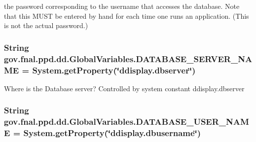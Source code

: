 the password corresponding to the username that accesses the database. Note that this M\-U\-S\-T be entered by hand for each time one runs an application. (This is not the actual password.) \hypertarget{classgov_1_1fnal_1_1ppd_1_1dd_1_1GlobalVariables_a84bb07dcee9c961579282f50a5031c0e}{
\subsubsection[{D\-A\-T\-A\-B\-A\-S\-E\-\_\-\-S\-E\-R\-V\-E\-R\-\_\-\-N\-A\-M\-E}]{\setlength{\rightskip}{0pt plus 5cm}String gov.\-fnal.\-ppd.\-dd.\-Global\-Variables.\-D\-A\-T\-A\-B\-A\-S\-E\-\_\-\-S\-E\-R\-V\-E\-R\-\_\-\-N\-A\-M\-E = System.\-get\-Property(\char`\"{}ddisplay.\-dbserver\char`\"{})\hspace{0.3cm}{\ttfamily [static]}}}\label{classgov_1_1fnal_1_1ppd_1_1dd_1_1GlobalVariables_a84bb07dcee9c961579282f50a5031c0e}
Where is the Database server? Controlled by system constant ddisplay.\-dbserver \hypertarget{classgov_1_1fnal_1_1ppd_1_1dd_1_1GlobalVariables_a1b5c1519d1964bf42b3fe4908ae6d444}{
\subsubsection[{D\-A\-T\-A\-B\-A\-S\-E\-\_\-\-U\-S\-E\-R\-\_\-\-N\-A\-M\-E}]{\setlength{\rightskip}{0pt plus 5cm}String gov.\-fnal.\-ppd.\-dd.\-Global\-Variables.\-D\-A\-T\-A\-B\-A\-S\-E\-\_\-\-U\-S\-E\-R\-\_\-\-N\-A\-M\-E = System.\-get\-Property(\char`\"{}ddisplay.\-dbusername\char`\"{})\hspace{0.3cm}{\ttfamily [static]}}}\label{classgov_1_1fnal_1_1ppd_1_1dd_1_1GlobalVariables_a1b5c1519d1964bf42b3fe4908ae6d444}
